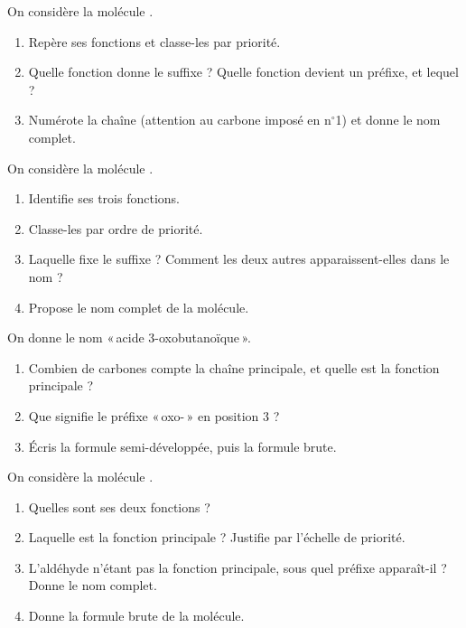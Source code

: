 \documentclass[11pt,a4paper]{article}
\begin{document}
\begin{exo}
On considère la molécule .
\begin{enumerate}[label=\alph*)]
  \item Repère ses fonctions et classe-les par priorité.
  \item Quelle fonction donne le suffixe ? Quelle fonction devient un préfixe, et lequel ?
  \item Numérote la chaîne (attention au carbone imposé en n$^\circ$1) et donne le nom complet.
\end{enumerate}
\end{exo}

\begin{exo}
On considère la molécule .
\begin{enumerate}[label=\alph*)]
  \item Identifie ses trois fonctions.
  \item Classe-les par ordre de priorité.
  \item Laquelle fixe le suffixe ? Comment les deux autres apparaissent-elles dans le nom ?
  \item Propose le nom complet de la molécule.
\end{enumerate}
\end{exo}

\begin{exo}
On donne le nom «\,acide 3-oxobutanoïque\,».
\begin{enumerate}[label=\alph*)]
  \item Combien de carbones compte la chaîne principale, et quelle est la fonction principale ?
  \item Que signifie le préfixe «\,oxo-\,» en position 3 ?
  \item Écris la formule semi-développée, puis la formule brute.
\end{enumerate}
\end{exo}

\begin{exo}
On considère la molécule .
\begin{enumerate}[label=\alph*)]
  \item Quelles sont ses deux fonctions ?
  \item Laquelle est la fonction principale ? Justifie par l'échelle de priorité.
  \item L'aldéhyde n'étant pas la fonction principale, sous quel préfixe apparaît-il ? Donne le nom complet.
  \item Donne la formule brute de la molécule.
\end{enumerate}
\end{exo}
\end{document}

